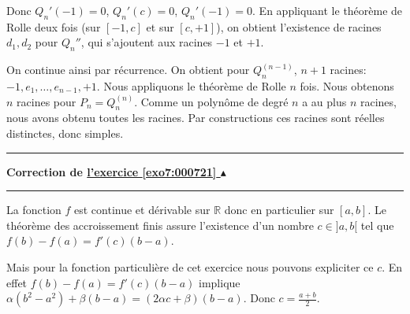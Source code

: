\documentclass[11pt,a4paper]{article}
\newcommand{\Rr}{\mathbb{R}} \newcommand{\R}{\mathbb{R}}
\newcounter{exo}
\newcommand{\correction}[1]{\hypertarget{cor7:#1}{}\label{cor7:#1}{\bf Correction de \hyperlink{exo7:#1}{l'exercice \ref{exo7:#1} $\blacktriangle$}}\vspace{1mm}\hrule\vspace{1mm}}
\newcommand{\fincorrection}{\vspace{1mm}\hrule\vspace*{7mm}}
\begin{document}
Donc $Q_n'(-1)=0$, $Q_n'(c)=0$, $Q_n'(-1)=0$. En appliquant le th\'eor\`eme de Rolle deux fois 
(sur $[-1,c]$ et sur $[c,+1]$), on obtient l'existence
de racines $d_1,d_2$ pour $Q_n''$, qui s'ajoutent aux racines $-1$ et $+1$.


On continue ainsi par r\'ecurrence. On obtient pour $Q_n^{(n-1)}$,
$n+1$ racines: $-1, e_1,\ldots, e_{n-1}, +1$. Nous appliquons le th\'eor\`eme de Rolle $n$ fois. Nous obtenons $n$ racines pour 
$P_n = Q_n^{(n)}$.  Comme un polyn\^ome de degr\'e $n$ a au plus
$n$ racines, nous avons obtenu toutes les racines. Par constructions ces racines sont r\'eelles distinctes, donc simples.
\fincorrection
\correction{000721}
La fonction $f$ est continue et dérivable sur $\Rr$ donc en particulier sur $[a,b]$.
Le théorème des accroissement finis assure l'existence d'un nombre $c \in ]a,b[$ tel que
$f(b)-f(a) = f'(c) (b-a)$.

Mais pour la fonction particulière de cet exercice nous pouvons expliciter ce $c$.
En effet $f(b)-f(a) = f'(c) (b-a)$ implique $\alpha(b^2-a^2)+\beta(b-a)= (2\alpha c+\beta)(b-a)$.
Donc $c = \frac{a+b}{2}$. 
\end{document}
